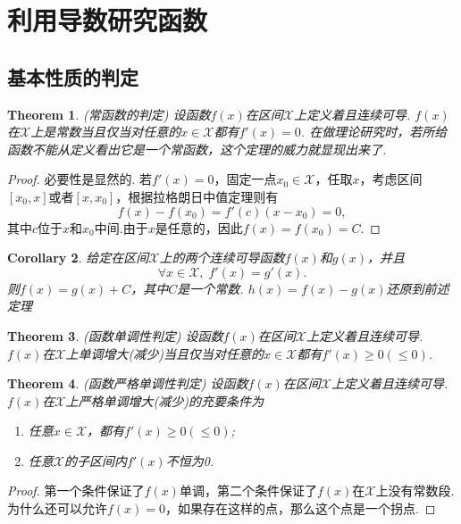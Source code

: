 \documentclass{article}
\newtheorem{theorem}{Theorem}[section]
\newtheorem{corollary}[theorem]{Corollary}
\begin{document}
\newpage
\section{利用导数研究函数}

\subsection{基本性质的判定}

\begin{theorem}
\rm {\color{red} (常函数的判定)} 设函数$f(x)$在区间$\mathcal{X}$上定义着且连续可导. $f(x)$在$\mathcal{X}$上是常数当且仅当对任意的$x \in \mathcal{X}$都有$f'(x)=0$. {\color{blue} 在做理论研究时，若所给函数不能从定义看出它是一个常函数，这个定理的威力就显现出来了.}
\end{theorem}

\begin{proof}
\rm 必要性是显然的. 若$f'(x)=0$，固定一点$x_0 \in \mathcal{X}$，任取$x$，考虑区间$[x_0,x]$或者$[x,x_0]$，根据拉格朗日中值定理则有
$$
f(x)-f(x_0) =f'(c)(x-x_0) = 0,
$$
其中$c$位于$x$和$x_0$中间.由于$x$是任意的，因此$f(x)=f(x_0)=C$. 
\end{proof}

\begin{corollary}
\rm 给定在区间$\mathcal{X}$上的两个连续可导函数$f(x)$和$g(x)$，并且
$$
\forall x \in \mathcal{X},\;f'(x) = g'(x).
$$
则$f(x) = g(x) + C$，其中$C$是一个常数. {\color{red} $h(x) = f(x) - g(x)$还原到前述定理}
\end{corollary}


\begin{theorem}
\rm {\color{red} (函数单调性判定)} 设函数$f(x)$在区间$\mathcal{X}$上定义着且连续可导. $f(x)$在$\mathcal{X}$上单调增大(减少)当且仅当对任意的$x \in \mathcal{X}$都有$f'(x) \geq 0(\leq 0)$.
\end{theorem}

\begin{theorem}
\rm {\color{red} (函数严格单调性判定)} 设函数$f(x)$在区间$\mathcal{X}$上定义着且连续可导. $f(x)$在$\mathcal{X}$上{\color{red}严格单调}增大(减少)的充要条件为
\begin{enumerate}
	\item 任意$x \in \mathcal{X}$，都有$f'(x) \geq 0(\leq 0)$;
	\item 任意$\mathcal{X}$的子区间内$f'(x)$不恒为0.
\end{enumerate}
\end{theorem}

\begin{proof}
{\color{blue}第一个条件保证了$f(x)$单调，第二个条件保证了$f(x)$在$\mathcal{X}$上没有常数段. 为什么还可以允许$f(x)=0$，如果存在这样的点，那么这个点是一个拐点}.
\end{proof}
\end{document}
